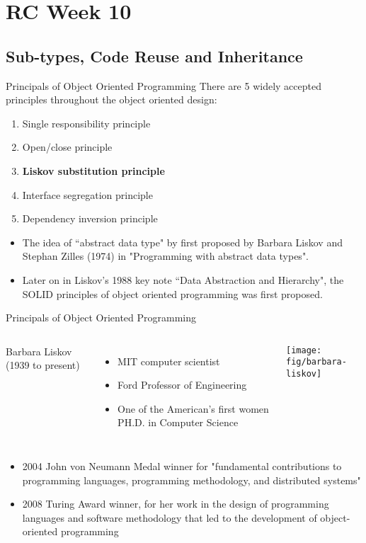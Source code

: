 \section{RC Week 10}
\subsection{Sub-types, Code Reuse and Inheritance}
\begin{frame}{Principals of Object Oriented Programming}
There are 5 widely accepted principles throughout the object oriented design:
\begin{enumerate}
	\item \alert{S}ingle responsibility principle
	\item \alert{O}pen/close principle
	\item \textbf{\alert{L}iskov substitution principle}
	\item \alert{I}nterface segregation principle
	\item \alert{D}ependency inversion principle
\end{enumerate}
\begin{itemize}
	\item The idea of ``abstract data type" by first proposed by Barbara Liskov and Stephan Zilles (1974) in  "Programming with abstract data types".
	\item Later on in Liskov's 1988 key note ``Data Abstraction and Hierarchy", the SOLID principles of object oriented programming was first proposed. 
\end{itemize}
\end{frame}
\begin{frame}{Principals of Object Oriented Programming}
\begin{columns}
Barbara Liskov (1939 to present)
\begin{itemize}
	\item MIT computer scientist
	\item Ford Professor of Engineering
	\item One of the American's first women PH.D. in Computer Science
\end{itemize}

	\vspace{-.15in}\hspace{-.18in}
	\texttt{[image: fig/barbara-liskov]}

\end{columns}
\begin{itemize}
	\item 2004 John von Neumann Medal winner for "fundamental contributions to programming languages, programming methodology, and distributed systems"
	\item 2008 Turing Award winner, for her work in the design of programming languages and software methodology that led to the development of object-oriented programming
\end{itemize}
\end{frame}

